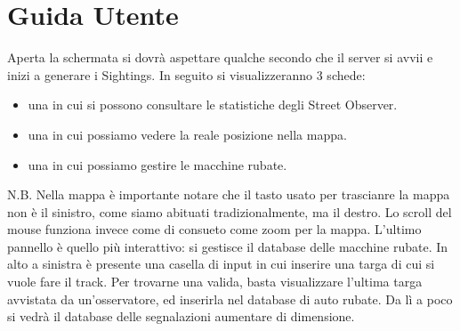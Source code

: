 \documentclass[a4paper,12pt]{report}
\begin{document}
\chapter{Guida Utente}
  
  Aperta la schermata si dovrà aspettare qualche secondo che il server si avvii 
e inizi a generare i Sightings. \newline
  In seguito si visualizzeranno 3 schede:
   \begin{itemize}
    \item una in cui si possono consultare le statistiche degli Street Observer.
    \item una in cui possiamo vedere la reale posizione nella mappa.
    \item una in cui possiamo gestire le macchine rubate.
   \end{itemize}
   
   N.B. Nella mappa è importante notare che il tasto usato per trascianre la 
mappa non è il sinistro, come siamo abituati tradizionalmente, ma il destro. Lo 
scroll del mouse funziona invece come di consueto come zoom per la mappa.
  \newline
  \newline
  L'ultimo pannello è quello più interattivo: si gestisce il database delle 
macchine rubate. In alto a sinistra è presente una casella di input in cui 
inserire una targa di cui si vuole fare il track. Per trovarne una valida, 
basta visualizzare l'ultima targa avvistata da un'osservatore, ed inserirla nel 
database di auto rubate. Da lì a poco si vedrà il database delle segnalazioni 
aumentare di dimensione.
\end{document}
